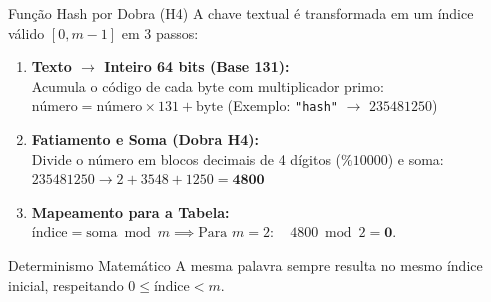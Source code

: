 \documentclass[aspectratio=169,11pt]{beamer}
\begin{document}
\begin{frame}{Função Hash por Dobra (H4)}
  A chave textual é transformada em um índice válido $[0, m-1]$ em 3 passos:

  \begin{enumerate}
    \setlength{\itemsep}{0.6em}
    \item \textbf{Texto $\rightarrow$ Inteiro 64 bits (Base 131):}\\
      Acumula o código de cada byte com multiplicador primo:\\
      $\text{número} = \text{número} \times 131 + \text{byte}$ \quad (Exemplo: \texttt{"hash"} $\rightarrow$ $235481250$)
    
    \item \textbf{Fatiamento e Soma (Dobra H4):}\\
      Divide o número em blocos decimais de 4 dígitos ($\% 10000$) e soma:\\
      $235481250 \rightarrow 2 + 3548 + 1250 = \mathbf{4800}$

    \item \textbf{Mapeamento para a Tabela:}\\
      $\text{índice} = \text{soma} \bmod m \implies \text{Para } m = 2: \quad 4800 \bmod 2 = \mathbf{0}$.
  \end{enumerate}

  \begin{alertblock}{Determinismo Matemático}
    A mesma palavra sempre resulta no mesmo índice inicial, respeitando $0 \le \text{índice} < m$.
  \end{alertblock}
\end{frame}
\end{document}
